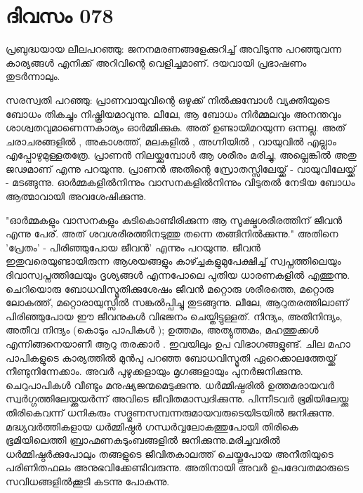 \newpage
\section{ദിവസം 078}


പ്രബുദ്ധയായ ലീലപറഞ്ഞു: ജനനമരണങ്ങളേക്കുറിച്ച്‌ അവിടുന്നു പറഞ്ഞുവന്ന കാര്യങ്ങള്‍ എനിക്ക്‌ അറിവിന്റെ വെളിച്ചമാണ്‌. ദയവായി പ്രഭാഷണം തുടര്‍ന്നാലും. 

സരസ്വതി പറഞ്ഞു: പ്രാണവായുവിന്റെ ഒഴുക്ക്‌ നില്‍ക്കുമ്പോള്‍ വ്യക്തിയുടെ ബോധം തികച്ചും നിഷ്ക്രിയമാവുന്നു. ലീലേ, ആ ബോധം നിര്‍മ്മലവും അനന്തവും ശാശ്വതവുമാണെന്നകാര്യം ഓര്‍മ്മിക്കുക. അത്‌ ഉണ്ടായിമറയുന്ന ഒന്നല്ല. അത്‌ ചരാചരങ്ങളില്‍ , അകാശത്ത്‌, മലകളില്‍ , അഗ്നിയില്‍ , വായുവില്‍ എല്ലാം എപ്പോഴുമുള്ളതത്രേ. പ്രാണന്‍ നിലയ്ക്കുമ്പോള്‍ ആ ശരീരം മരിച്ചു, അല്ലെങ്കില്‍ അതു ജഢമാണ്‌ എന്നു പറയുന്നു. പ്രാണന്‍ അതിന്റെ സ്രോതസ്സിലേയ്ക്ക്‌ - വായുവിലേയ്ക്ക്‌ - മടങ്ങുന്നു. ഓര്‍മ്മകളില്‍നിന്നും വാസനകളില്‍നിന്നും വിടുതല്‍ നേടിയ ബോധം ആത്മാവായി അവശേഷിക്കുന്നു.

"ഓര്‍മ്മകളും വാസനകളും കുടികൊണ്ടിരിക്കുന്ന ആ സൂക്ഷ്മശരീരത്തിന്‌ ജീവന്‍ എന്നു പേര്‌. അത്‌ ശവശരീരത്തിനടുത്തു തന്നെ തങ്ങിനില്‍ക്കുന്നു." അതിനെ 'പ്രേതം' - പിരിഞ്ഞുപോയ ജീവന്‍' എന്നും പറയുന്നു. ജീവന്‍ ഇതുവരെയുണ്ടായിരുന്ന ആശയങ്ങളും കാഴ്ച്ചകളുമുപേക്ഷിച്ച്‌ സ്വപ്നത്തിലെയും ദിവാസ്വപ്നത്തിലേയും ദൃശ്യങ്ങള്‍ എന്നപോലെ പുതിയ ധാരണകളില്‍ എത്തുന്നു. ചെറിയൊരു ബോധവിസ്മൃതിക്കുശേഷം ജീവന്‍ മറ്റൊരു ശരീരത്തെ, മറ്റൊരു ലോകത്ത്‌, മറ്റൊരായുസ്സില്‍ സങ്കല്‍പ്പിച്ചു തുടങ്ങുന്നു. ലീലേ, ആറുതരത്തിലാണ്‌ പിരിഞ്ഞുപോയ ഈ ജീവനുകള്‍ വിഭജനം ചെയ്തിട്ടുള്ളത്‌. നിന്ദ്യം, അതിനിന്ദ്യം, അതീവ നിന്ദ്യം (കൊടും പാപികള്‍ ); ഉത്തമം, അത്യുത്തമം, മഹത്തുക്കള്‍ എന്നിങ്ങനെയാണീ ആറു തരക്കാര്‍ . ഇവയിലും ഉപ വിഭാഗങ്ങളുണ്ട്‌. ചില മഹാ പാപികളുടെ കാര്യത്തില്‍ മുന്‍പു പറഞ്ഞ ബോധവിസ്മൃതി ഏറെക്കാലത്തേയ്ക്ക്‌ നീണ്ടുനിന്നേക്കാം. അവര്‍ പുഴുക്കളായും മൃഗങ്ങളായും പുനര്‍ജനിക്കുന്നു. ചെറുപാപികള്‍ വീണ്ടും മനുഷ്യജന്മമെടുക്കുന്നു. ധര്‍മ്മിഷ്ഠരില്‍ ഉത്തമരായവര്‍ സ്വര്‍ഗ്ഗത്തിലേയ്ക്കുയര്‍ന്ന് അവിടെ ജീവിതമാസ്വദിക്കുന്നു. പിന്നീടവര്‍ ഭൂമിയിലേയ്ക്കു തിരികെവന്ന് ധനികരും സദ്ഗുണസമ്പന്നരുമായവരുടെയിടയില്‍ ജനിക്കുന്നു. മദ്ധ്യവര്‍ത്തികളായ ധര്‍മ്മിഷ്ഠര്‍ ഗന്ധര്‍വ്വലോകത്തുപോയി തിരികെ ഭൂമിയിലെത്തി ബ്രാഹ്മണകുടുംബങ്ങളില്‍ ജനിക്കുന്നു.മരിച്ചവരില്‍ ധര്‍മ്മിഷ്ഠര്‍ക്കുപോലും തങ്ങളുടെ ജീവിതകാലത്ത്‌ ചെയ്തുപോയ അനീതിയുടെ പരിണിതഫലം അനുഭവിക്കേണ്ടിവരുന്നു. അതിനായി അവര്‍ ഉപദേവതമാരുടെ സവിധങ്ങളില്‍ക്കൂടി കടന്നു പോകുന്നു.

